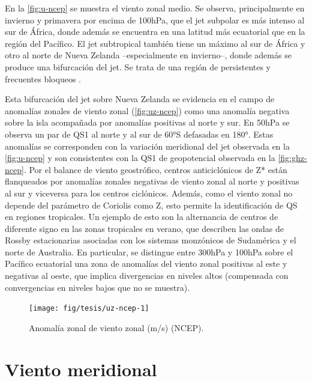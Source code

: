 \documentclass[spanish,a4paper,12pt,oneside]{book}
\begin{document}
En la \autoref{fig:u-ncep} se muestra el viento zonal medio. Se observa,
principalmente en invierno y primavera por encima de 100hPa, que el jet
subpolar es más intenso al sur de África, donde además se encuentra en
una latitud más ecuatorial que en la región del Pacífico. El jet
subtropical también tiene un máximo al sur de África y otro al norte de
Nueva Zelanda --especialmente en invierno--, donde además se produce una
bifurcación del jet. Se trata de una región de persistentes y frecuentes
bloqueos \citep[ej.][]{Trenberth1985}.

Esta bifurcación del jet sobre Nueva Zelanda se evidencia en el campo de
anomalías zonales de viento zonal (\autoref{fig:uz-ncep}) como una
anomalía negativa sobre la isla acompañada por anomalías positivas al
norte y sur. En 50hPa se observa un par de QS1 al norte y al sur de 60°S
defasadas en 180°. Estas anomalías se corresponden con la variación
meridional del jet observada en la \autoref{fig:u-ncep} y son
consistentes con la QS1 de geopotencial observada en la
\autoref{fig:ghz-ncep}. Por el balance de viento geostrófico, centros
anticiclónicos de Z* están flanqueados por anomalías zonales negativas
de viento zonal al norte y positivas al sur y viceversa para los centros
ciclónicos. Además, como el viento zonal no depende del parámetro de
Coriolis como Z, esto permite la identificación de QS en regiones
tropicales. Un ejemplo de esto son la alternancia de centros de
diferente signo en las zonas tropicales en verano, que describen las
ondas de Rossby estacionarias asociadas con los sistemas monzónicos de
Sudamérica y el norte de Australia. En particular, se distingue entre
300hPa y 100hPa sobre el Pacífico ecuatorial una zona de anomalías del
viento zonal positivas al este y negativas al oeste, que implica
divergencias en niveles altos (compensada con convergencias en niveles
bajos que no se muestra).

\begin{landscape}\begin{figure}

{\centering \texttt{[image: fig/tesis/uz-ncep-1]} 

}

\caption{Anomalía zonal de viento zonal (m/s) (NCEP).}\label{fig:uz-ncep}
\end{figure}
\end{landscape}

\hypertarget{viento-meridional}{%
\section{Viento meridional}\label{viento-meridional}}
\end{document}
